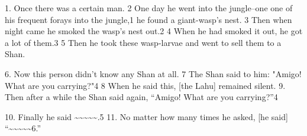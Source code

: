 \setcounter{footnote}{0}


1. Once there was a certain man. 2 One day he went into the jungle--one one of his
frequent forays into the jungle,1 he found a giant-wasp's nest. 3 Then when night
came he smoked the wasp's nest out.2 4 When he had smoked it out, he got a lot
of them.3 5 Then he took these wasp-larvae and went to sell them to a Shan.

6. Now this person didn't know any Shan at all. 7 The Shan said to him: "Amigo!
What are you carrying?"4 8 When he said this, [the Lahu] remained silent.
9. Then after a while the Shan said again, ``Amigo! What are you carrying?''4

10. Finally he said \textasciitilde{}\textasciitilde{}\textasciitilde{}\textasciitilde{}\textasciitilde{}.5
11. No matter how many times he asked, [he said] ``\textasciitilde{}\textasciitilde{}\textasciitilde{}\textasciitilde{}\textasciitilde{}6.''

